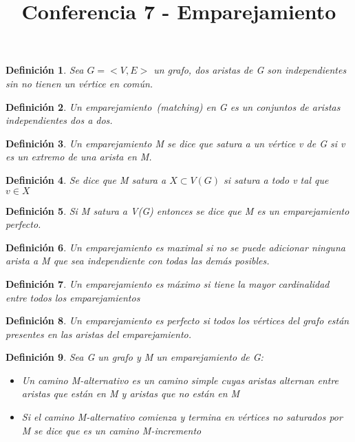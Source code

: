 \documentclass[a4paper,1pt]{report}
\title{Conferencia 7 - Emparejamiento}
\author{}
\newtheorem*{dfn}{Definición}
\begin{document}
\maketitle

\begin{dfn}
 Sea $G=<V,E>$ un grafo, dos aristas de G son independientes sin no tienen un vértice en común.
\end{dfn}

\begin{dfn}
 Un emparejamiento~(\textit{matching}) en G es un conjuntos de aristas independientes dos a dos.
\end{dfn}

\begin{dfn}
 Un emparejamiento M se dice que satura a un vértice v de G si v es un extremo de una arista en M.
\end{dfn}

\begin{dfn}
 Se dice que M satura a $X\subset V(G)$ si satura a todo v tal que $v\in X$
\end{dfn}

\begin{dfn}
 Si M satura a V(G) entonces se dice que M es un emparejamiento perfecto.
\end{dfn}

\begin{dfn}
 Un emparejamiento es maximal si no se puede adicionar ninguna arista a M que sea independiente con todas las demás posibles.
\end{dfn}

\begin{dfn}
 Un emparejamiento es máximo si tiene la mayor cardinalidad entre todos los emparejamientos
\end{dfn}

\begin{dfn}
 Un emparejamiento es  perfecto si todos los vértices del grafo están presentes en las aristas del emparejamiento.
\end{dfn}

\begin{dfn}
 Sea G un grafo y M un emparejamiento de G:
 \begin{itemize}
  \item Un camino M-alternativo es un camino simple cuyas aristas alternan entre aristas que están en M y aristas que no están en M
  \item Si el camino M-alternativo comienza y termina en vértices no saturados por M se dice que es un camino M-incremento
 \end{itemize}
\end{dfn}
\end{document}
